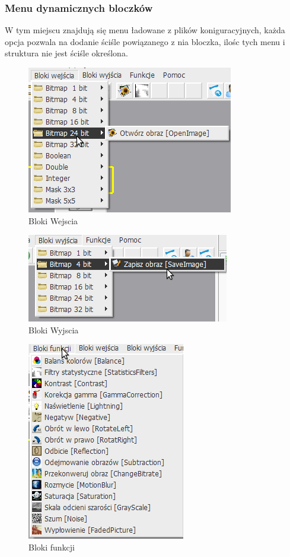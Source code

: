 \documentclass[a4paper,10pt]{article}
\begin{document}
\subsubsection{Menu dynamicznych bloczków}
W tym miejscu znajdują się menu ładowane z plików koniguracyjnych, każda opcja pozwala na dodanie ściśle powiązanego z nia bloczka, ilośc tych menu i struktura nie jest ściśle określona.
\begin{figure}[ht]
 \centering
 \includegraphics[scale=0.5]{blokwejscia}
 \caption{Bloki Wejscia}
 \label{fig:inputblock}
\end{figure}
\begin{figure}[ht]
 \centering
 \includegraphics[scale=0.5]{blokwyjscia}
 \caption{Bloki Wyjscia}
 \label{fig:outputblock}
\end{figure}
\begin{figure}[ht]
 \centering
 \includegraphics[scale=0.5]{blokfunkcji}
 \caption{Bloki funkcji}
 \label{fig:outputblock}
\end{figure}
\end{document}
